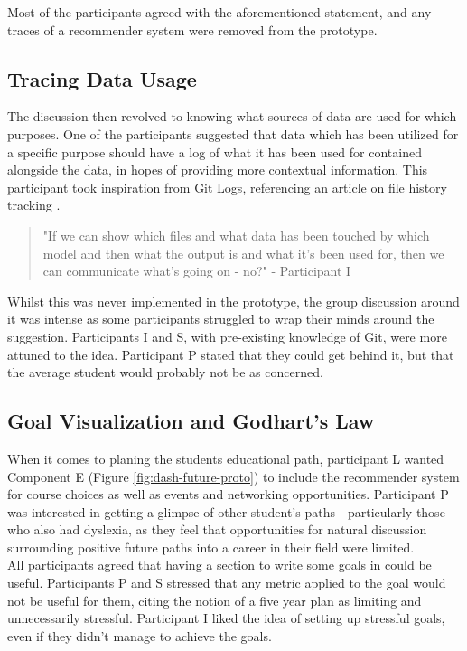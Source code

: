 \documentclass{l4proj}
\begin{document}
Most of the participants agreed with the aforementioned statement, and any traces of a recommender system were removed from the prototype.

\subsection{Tracing Data Usage}
The discussion then revolved to knowing what sources of data are used for which purposes. One of the participants suggested that data which has been utilized for a specific purpose should have a log of what it has been used for contained alongside the data, in hopes of providing more contextual information. This participant took inspiration from Git Logs, referencing an article on file history tracking \citet{Stolee_2022}. 

\begin{quote}
    "If we can show which files and what data has been touched by which model and then what the output is and what it's been used for, then we can communicate what's going on - no?" - Participant I
\end{quote}

Whilst this was never implemented in the prototype, the group discussion around it was intense as some participants struggled to wrap their minds around the suggestion. Participants I and S, with pre-existing knowledge of Git, were more attuned to the idea. Participant P stated that they could get behind it, but that the average student would probably not be as concerned.

\subsection{Goal Visualization and Godhart's Law}
When it comes to planing the students educational path, participant L wanted Component E (Figure \ref{fig:dash-future-proto}) to include the recommender system for course choices as well as events and networking opportunities. Participant P was interested in getting a glimpse of other student's paths - particularly those who also had dyslexia, as they feel that opportunities for natural discussion surrounding positive future paths into a career in their field were limited. 
\hfill \\

All participants agreed that having a section to write some goals in could be useful. Participants P and S stressed that any metric applied to the goal would not be useful for them, citing the notion of a five year plan as limiting and unnecessarily stressful. Participant I liked the idea of setting up stressful goals, even if they didn't manage to achieve the goals.
\end{document}
